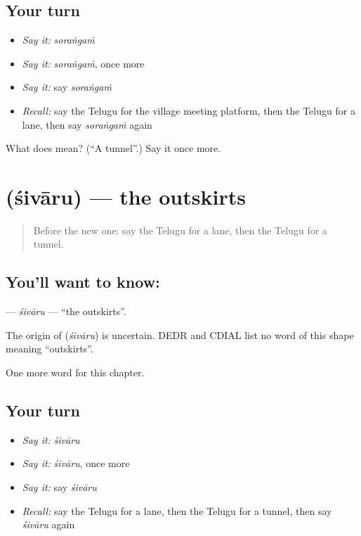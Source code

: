 \subsection*{Your turn}
\begin{itemize}
\raggedright
  \item \emph{Say it:} \emph{soraṅgaṁ}
  \item \emph{Say it:} \emph{soraṅgaṁ}, once more
  \item \emph{Say it:} say \emph{soraṅgaṁ}
  \item \emph{Recall:} say the Telugu for the village meeting platform, then the Telugu for a lane, then say \emph{soraṅgaṁ} again
\end{itemize}

\begin{tcolorbox}[breakable,colback=teal!4,colframe=teal!35!black,title={Before you move on}]
What does  mean? (\textquotedblleft{}A tunnel\textquotedblright{}.) Say it once more.
\end{tcolorbox}
\section[\texorpdfstring{\te{శివారు} (śivāru)}{శివారు (śivāru)}]{ (śivāru) — the outskirts}

\label{lesson:TE-C256-sivaru}



\begin{quote}
Before the new one: say the Telugu for a lane, then the Telugu for a tunnel.
\end{quote}

\subsection*{You'll want to know: }
\textbf{} — \emph{śivāru} — \textquotedblleft{}the outskirts\textquotedblright{}.

\begin{cousinweb}
The origin of \textbf{} (\emph{śivāru}) is uncertain. DEDR and CDIAL list no word of this shape meaning \textquotedblleft{}outskirts\textquotedblright{}.
\end{cousinweb}

\begin{grammarlens}[title={What you've built}]
One more word for this chapter.
\end{grammarlens}

\subsection*{Your turn}
\begin{itemize}
\raggedright
  \item \emph{Say it:} \emph{śivāru}
  \item \emph{Say it:} \emph{śivāru}, once more
  \item \emph{Say it:} say \emph{śivāru}
  \item \emph{Recall:} say the Telugu for a lane, then the Telugu for a tunnel, then say \emph{śivāru} again
\end{itemize}

